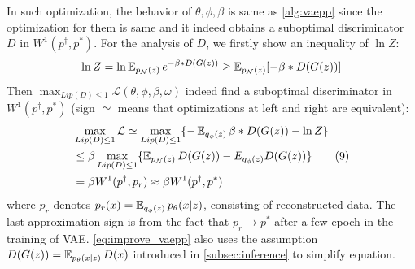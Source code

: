 In such optimization, the behavior of $\theta, \phi, \beta$ is same as \cref{alg:vaepp} since the optimization for them is same and it indeed obtains a suboptimal discriminator $D$ in $W^1(p^\dag, p^*)$. For the analysis of $D$, we firstly show an inequality of $\ln Z$:
\begin{equation*}
	\ln Z = \ln \operatorname{\mathbb{E}}_{p_\mathcal{N}(z)} e^{- \beta * D(G(z))} \geq \operatorname{\mathbb{E}}_{p_\mathcal{N}(z)} [- \beta * D(G(z))]
\end{equation*}
Then $\max_{Lip(D) \leq 1} \mathcal{L}(\theta, \phi, \beta, \omega)$ indeed find a suboptimal discriminator in $W^1(p^\dag, p^*)$ (sign $\simeq$ means that optimizations at left and right are equivalent):
\begin{align*}\label{eq:improve_vaepp}
	&\max_{Lip(D) \leq 1} \mathcal{L} \simeq \max_{Lip(D) \leq 1} \{ -\operatorname{\mathbb{E}}_{q_\phi(z)} \beta*D(G(z)) - \ln Z \}\\ 
	&\leq \beta \max_{Lip(D) \leq 1} \{ \operatorname{\mathbb{E}}_{p_\mathcal{N}(z)} D(G(z)) - E_{q_\phi(z)} D(G(z)) \} \tag{9} \\
	&= \beta W^1(p^\dag, p_r) \approx \beta W^1(p^\dag, p^*) 
\end{align*}
where $p_r$ denotes $p_r(x) = \operatorname{\mathbb{E}}_{q_\phi(z)} p_\theta(x|z)$, consisting of reconstructed data. The last approximation sign is from the fact that $p_r \rightarrow p^*$ after a few epoch in the training of VAE. \cref{eq:improve_vaepp} also uses the assumption $D(G(z)) = \operatorname{\mathbb{E}}_{p_\theta(x|z)} D(x)$ introduced in \cref{subsec:inference} to simplify equation. 

